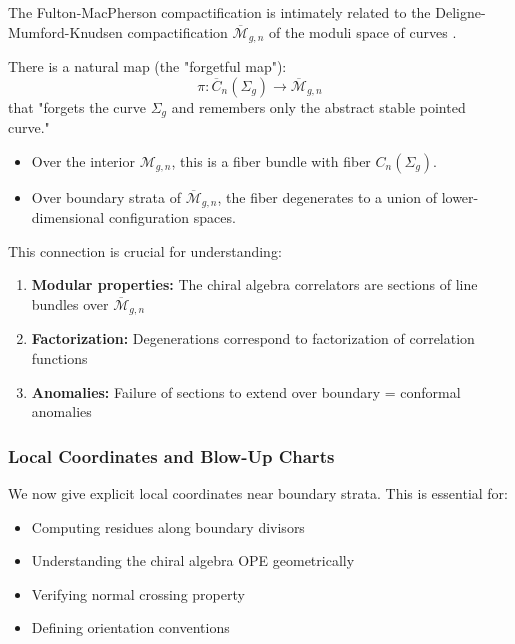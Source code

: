 \begin{remark}\label{rem:moduli-stable-curves}
The Fulton-MacPherson compactification is intimately related to the Deligne-Mumford-Knudsen compactification $\overline{\mathcal{M}}_{g,n}$ of the moduli space of curves \cite{DM69, Knu83}. 

There is a natural map (the "forgetful map"):
$$\pi: \overline{C}_n(\Sigma_g) \to \overline{\mathcal{M}}_{g,n}$$
that "forgets the curve $\Sigma_g$ and remembers only the abstract stable pointed curve."

\begin{itemize}
\item Over the interior $\mathcal{M}_{g,n}$, this is a fiber bundle with fiber $C_n(\Sigma_g)$.
\item Over boundary strata of $\overline{\mathcal{M}}_{g,n}$, the fiber degenerates to a union of lower-dimensional configuration spaces.
\end{itemize}

This connection is crucial for understanding:
\begin{enumerate}
\item \textbf{Modular properties:} The chiral algebra correlators are sections of line bundles over $\overline{\mathcal{M}}_{g,n}$
\item \textbf{Factorization:} Degenerations correspond to factorization of correlation functions
\item \textbf{Anomalies:} Failure of sections to extend over boundary = conformal anomalies
\end{enumerate}
\end{remark}

\subsubsection{Local Coordinates and Blow-Up Charts}

We now give explicit local coordinates near boundary strata. This is essential for:
\begin{itemize}
\item Computing residues along boundary divisors
\item Understanding the chiral algebra OPE geometrically
\item Verifying normal crossing property
\item Defining orientation conventions
\end{itemize}

